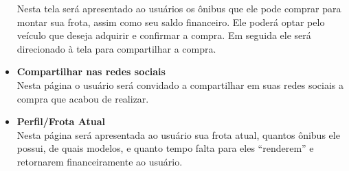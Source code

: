 \begin{itemize}
    Nesta tela será apresentado ao usuários os ônibus que ele pode comprar para montar sua frota, assim como seu saldo financeiro. Ele poderá optar pelo veículo que deseja adquirir e confirmar a compra. Em seguida ele será direcionado à tela para compartilhar a compra.
    \item \textbf{Compartilhar nas redes sociais} \hfill \\
    Nesta página o usuário será convidado a compartilhar em suas redes sociais a compra que acabou de realizar.
    \item \textbf{Perfil/Frota Atual} \hfill \\
    Nesta página será apresentada ao usuário sua frota atual, quantos ônibus ele possui, de quais modelos, e quanto tempo falta para eles ``renderem'' e retornarem financeiramente ao usuário.
\end{itemize}




